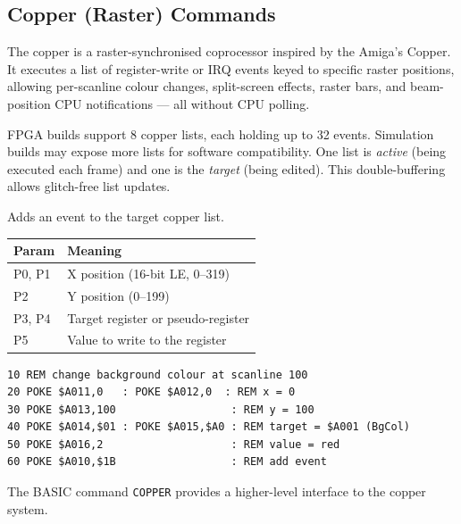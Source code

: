\subsection{Copper (Raster) Commands}
\label{sec:vgc-copper-cmds}

The copper is a raster-synchronised coprocessor inspired by the Amiga's
Copper.  It executes a list of register-write or IRQ events keyed to
specific raster positions, allowing per-scanline colour changes, split-screen
effects, raster bars, and beam-position CPU notifications --- all without
CPU polling.

FPGA builds support 8 copper lists, each holding up to 32 events.  Simulation
builds may expose more lists for software compatibility.  One list is
\emph{active} (being executed each frame) and one is the \emph{target} (being
edited).  This double-buffering allows glitch-free list updates.



Adds an event to the target copper list.

\begin{center}
\small
\begin{tabular}{@{}ll@{}}
\toprule
\textbf{Param} & \textbf{Meaning} \\
\midrule
P0, P1 & X position (16-bit LE, 0--319) \\
P2     & Y position (0--199) \\
P3, P4 & Target register or pseudo-register \\
P5     & Value to write to the register \\
\bottomrule
\end{tabular}
\end{center}

\begin{lstlisting}
10 REM change background colour at scanline 100
20 POKE $A011,0   : POKE $A012,0  : REM x = 0
30 POKE $A013,100                  : REM y = 100
40 POKE $A014,$01 : POKE $A015,$A0 : REM target = $A001 (BgCol)
50 POKE $A016,2                    : REM value = red
60 POKE $A010,$1B                  : REM add event
\end{lstlisting}

\begin{notebox}
The BASIC command \texttt{COPPER} provides a higher-level interface to the
copper system.
\end{notebox}

